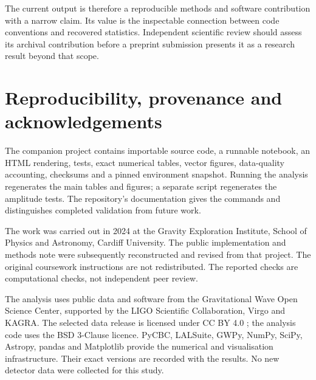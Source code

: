 \documentclass[11pt,a4paper]{article}
\begin{document}
The current output is therefore a reproducible methods and software contribution with a narrow claim. Its value is the inspectable connection between code conventions and recovered statistics. Independent scientific review should assess its archival contribution before a preprint submission presents it as a research result beyond that scope.

\section{Reproducibility, provenance and acknowledgements}
The companion project contains importable source code, a runnable notebook, an HTML rendering, tests, exact numerical tables, vector figures, data-quality accounting, checksums and a pinned environment snapshot. Running the analysis regenerates the main tables and figures; a separate script regenerates the amplitude tests. The repository's documentation gives the commands and distinguishes completed validation from future work.

The work was carried out in 2024 at the Gravity Exploration Institute, School of Physics and Astronomy, Cardiff University. The public implementation and methods note were subsequently reconstructed and revised from that project. The original coursework instructions are not redistributed. The reported checks are computational checks, not independent peer review.

The analysis uses public data and software from the Gravitational Wave Open Science Center, supported by the LIGO Scientific Collaboration, Virgo and KAGRA. The selected data release is licensed under CC BY 4.0 \cite{data}; the analysis code uses the BSD 3-Clause licence. PyCBC, LALSuite, GWPy, NumPy, SciPy, Astropy, pandas and Matplotlib provide the numerical and visualisation infrastructure. Their exact versions are recorded with the results. No new detector data were collected for this study.
\end{document}
